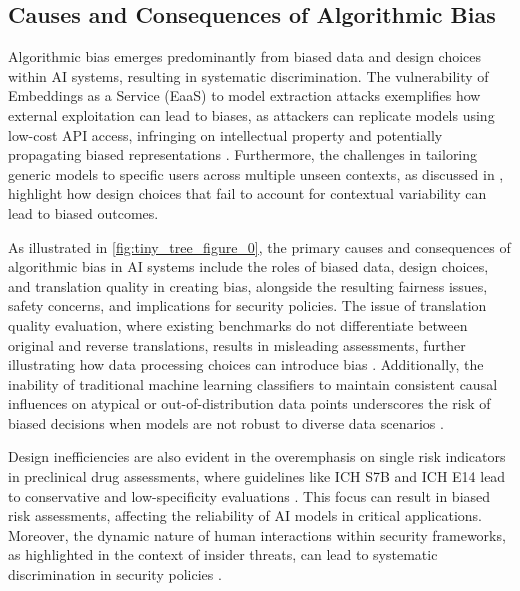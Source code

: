 
 






\subsection{Causes and Consequences of Algorithmic Bias} \label{subsec:Causes and Consequences of Algorithmic Bias}

Algorithmic bias emerges predominantly from biased data and design choices within AI systems, resulting in systematic discrimination. The vulnerability of Embeddings as a Service (EaaS) to model extraction attacks exemplifies how external exploitation can lead to biases, as attackers can replicate models using low-cost API access, infringing on intellectual property and potentially propagating biased representations \cite{wang2024espewrobustcopyrightprotection}. Furthermore, the challenges in tailoring generic models to specific users across multiple unseen contexts, as discussed in \cite{kaur2024cropcontextwiserobuststatic}, highlight how design choices that fail to account for contextual variability can lead to biased outcomes.

As illustrated in \autoref{fig:tiny_tree_figure_0}, the primary causes and consequences of algorithmic bias in AI systems include the roles of biased data, design choices, and translation quality in creating bias, alongside the resulting fairness issues, safety concerns, and implications for security policies. The issue of translation quality evaluation, where existing benchmarks do not differentiate between original and reverse translations, results in misleading assessments, further illustrating how data processing choices can introduce bias \cite{bogoychev2020domaintranslationesenoisesynthetic}. Additionally, the inability of traditional machine learning classifiers to maintain consistent causal influences on atypical or out-of-distribution data points underscores the risk of biased decisions when models are not robust to diverse data scenarios \cite{sen2018supervisingfeatureinfluence}.

Design inefficiencies are also evident in the overemphasis on single risk indicators in preclinical drug assessments, where guidelines like ICH S7B and ICH E14 lead to conservative and low-specificity evaluations \cite{xi2022statisticallearningpreclinicaldrug}. This focus can result in biased risk assessments, affecting the reliability of AI models in critical applications. Moreover, the dynamic nature of human interactions within security frameworks, as highlighted in the context of insider threats, can lead to systematic discrimination in security policies \cite{kammller2020applyingisabelleinsiderframework}.

